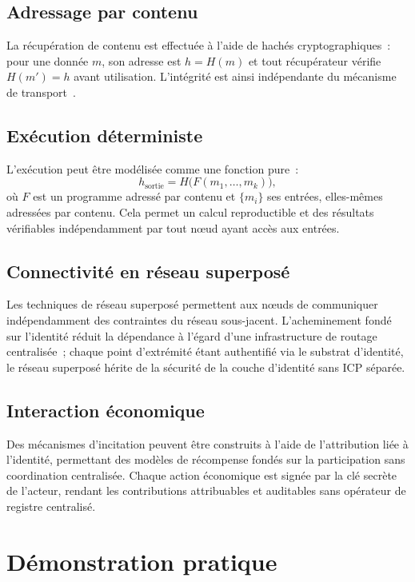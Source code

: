 \documentclass[11pt,a4paper]{article}
\begin{document}
\subsection{Adressage par contenu}

La récupération de contenu est effectuée à l'aide de hachés cryptographiques~:
pour une donnée $m$, son adresse est $h = H(m)$ et tout récupérateur vérifie
$H(m') = h$ avant utilisation.  L'intégrité est ainsi indépendante du
mécanisme de transport~\cite{ipfs}.

\subsection{Exécution déterministe}

L'exécution peut être modélisée comme une fonction pure~:
\[
  h_{\mathrm{sortie}} = H\bigl(F(m_1, \ldots, m_k)\bigr),
\]
où $F$ est un programme adressé par contenu et $\{m_i\}$ ses entrées,
elles-mêmes adressées par contenu.  Cela permet un calcul reproductible et
des résultats vérifiables indépendamment par tout nœud ayant accès aux entrées.

\subsection{Connectivité en réseau superposé}

Les techniques de réseau superposé permettent aux nœuds de communiquer
indépendamment des contraintes du réseau sous-jacent.  L'acheminement fondé
sur l'identité réduit la dépendance à l'égard d'une infrastructure de
routage centralisée~; chaque point d'extrémité étant authentifié via le
substrat d'identité, le réseau superposé hérite de la sécurité de la couche
d'identité sans ICP séparée.

\subsection{Interaction économique}

Des mécanismes d'incitation peuvent être construits à l'aide de l'attribution
liée à l'identité, permettant des modèles de récompense fondés sur la
participation sans coordination centralisée.  Chaque action économique est
signée par la clé secrète de l'acteur, rendant les contributions
attribuables et auditables sans opérateur de registre centralisé.

\section{Démonstration pratique}
\end{document}

